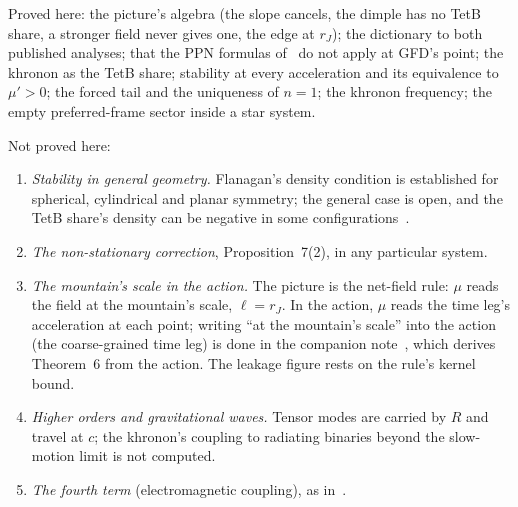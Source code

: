 \documentclass[twocolumn]{iopjournal}
\begin{document}
Proved here: the picture's algebra (the slope cancels, the dimple has
no TetB share, a stronger field never gives one, the edge at $r_J$);
the dictionary to both published analyses; that the PPN
formulas of~\cite{BB2015} do not apply at GFD's point; the khronon as
the TetB share; stability at every acceleration and its equivalence to
$\mu' > 0$; the forced tail and the uniqueness of $n = 1$; the
khronon frequency; the empty preferred-frame sector inside a star
system.

Not proved here:
\begin{enumerate}
\item \emph{Stability in general geometry.} Flanagan's density
condition is established for spherical, cylindrical and planar
symmetry; the general case is open, and the TetB share's density can
be negative in some configurations~\cite{Flanagan2023}.
\item \emph{The non-stationary correction}, Proposition~7(2), in any
particular system.
\item \emph{The mountain's scale in the action.} The picture is the
net-field rule: $\mu$ reads the field at the mountain's scale,
$\ell = r_J$. In the action, $\mu$ reads the time leg's acceleration
at each point; writing ``at the mountain's scale'' into the action
(the coarse-grained time leg) is done in the companion
note~\cite{NelsonMS}, which derives Theorem~6 from the action. The
leakage figure rests on the rule's kernel bound.
\item \emph{Higher orders and gravitational waves.} Tensor modes are
carried by $R$ and travel at $c$; the khronon's coupling to radiating
binaries beyond the slow-motion limit is not computed.
\item \emph{The fourth term} (electromagnetic coupling), as
in~\cite{NelsonTL}.
\end{enumerate}

\end{document}
